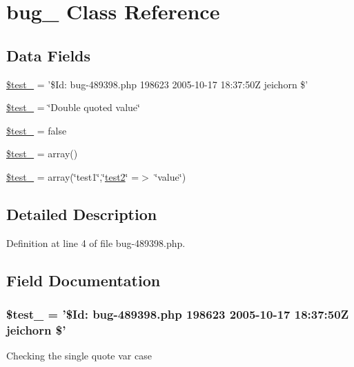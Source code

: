 \hypertarget{classbug__489398}{\section{bug\-\_ \-Class \-Reference}
\label{classbug__489398}
}
\subsection*{\-Data \-Fields}
\begin{DoxyCompactItemize}
\item 
\hyperlink{classbug__489398_a9b0ece23852ddda597903eb7f78a0869}{\$test\-\_} = '\$\-Id\-: bug-\/489398.php 198623 2005-\/10-\/17 18\-:37\-:50\-Z jeichorn \$'
\item 
\hyperlink{classbug__489398_a3afb152bed5fe9785df5eb7d57950179}{\$test\-\_} = \char`\"{}\-Double quoted value\char`\"{}
\item 
\hyperlink{classbug__489398_a04aab10fb3c4b687c2529d8aa36c926d}{\$test\-\_} = false
\item 
\hyperlink{classbug__489398_ab4f9cd222b2aa62fdf800cb3ccabbf24}{\$test\-\_} = array()
\item 
\hyperlink{classbug__489398_a0acf689202cf618890955ac1dc66ff95}{\$test\-\_} = array(\char`\"{}test1\char`\"{},\char`\"{}\hyperlink{classtest2}{test2}\char`\"{} =$>$ \char`\"{}value\char`\"{})
\end{DoxyCompactItemize}


\subsection{\-Detailed \-Description}


\-Definition at line 4 of file bug-\/489398.\-php.



\subsection{\-Field \-Documentation}
\hypertarget{classbug__489398_a9b0ece23852ddda597903eb7f78a0869}{
\subsubsection[{\$test\-\_\-01}]{\setlength{\rightskip}{0pt plus 5cm}\$test\-\_ = '\$\-Id\-: bug-\/489398.php 198623 2005-\/10-\/17 18\-:37\-:50\-Z jeichorn \$'}}\label{classbug__489398_a9b0ece23852ddda597903eb7f78a0869}
\-Checking the single quote var case 

